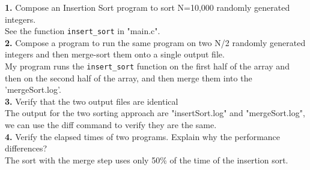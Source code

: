 \documentclass{article}
\begin{document}
\textbf{1.} Compose an Insertion Sort program to sort N=10,000 randomly generated integers.\\
\indent See the function \texttt{insert\_sort} in "main.c".\\

\textbf{2.} Compose a program to run the same program on two N/2 randomly generated integers and then merge-sort them onto a single output file.\\
\indent My program runs the \texttt{insert\_sort} function on the first half of the array and then on the second half of the array, and then merge them into the 'mergeSort.log'. \\

\textbf{3.} Verify that the two output files are identical\\
\indent The output for the two sorting approach are "insertSort.log" and "mergeSort.log", we can use the diff command to verify they are the same.\\

\textbf{4.} Verify the elapsed times of two programs. Explain why the performance differences?\\
\indent The sort with the merge step uses only 50\% of the time of the insertion sort.\\
\end{document}
